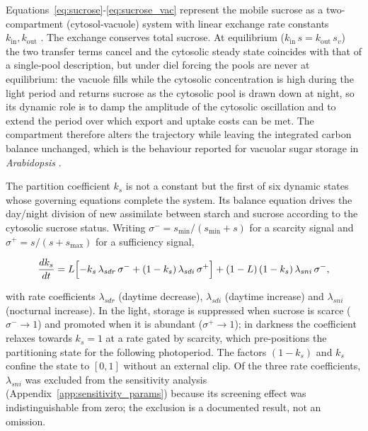 \documentclass[a4paper,fleqn]{cas-sc}
\begin{document}
Equations~\eqref{eq:sucrose}-\eqref{eq:sucrose_vac} represent the mobile
sucrose as a two-compartment (cytosol-vacuole) system with linear
exchange rate constants $k_{\text{in}},k_{\text{out}}$
\citep{Lohaus2000,Nadwodnik2008}. The exchange conserves total sucrose. At
equilibrium ($k_{\text{in}}\,s = k_{\text{out}}\,s_v$) the two transfer
terms cancel and the cytosolic steady state coincides with that of a
single-pool description, but under diel forcing the pools are never at
equilibrium: the vacuole fills while the cytosolic concentration is high
during the light period and returns sucrose as the cytosolic pool is drawn
down at night, so its dynamic role is to damp the amplitude of the
cytosolic oscillation and to extend the period over which export and
uptake costs can be met. The compartment therefore alters the trajectory
while leaving the integrated carbon balance unchanged, which is the
behaviour reported for vacuolar sugar storage in \textit{Arabidopsis}
\citep{Lohaus2000,Nadwodnik2008}.

The partition coefficient $k_s$ is not a constant but the first of six
dynamic states whose governing equations complete the system. Its balance
equation drives the day/night division of new assimilate between starch and
sucrose according to the cytosolic sucrose status. Writing
$\sigma^{-} = s_{\min}/(s_{\min}+s)$ for a scarcity signal and
$\sigma^{+} = s/(s+s_{\max})$ for a sufficiency signal,

\begin{equation}
\frac{dk_s}{dt} =
L\Bigl[
-k_s\,\lambda_{sdr}\,\sigma^{-}
+ (1-k_s)\,\lambda_{sdi}\,\sigma^{+}
\Bigr]
+ (1-L)\,(1-k_s)\,\lambda_{sni}\,\sigma^{-},
\label{eq:dks}
\end{equation}

with rate coefficients $\lambda_{sdr}$ (daytime decrease),
$\lambda_{sdi}$ (daytime increase) and $\lambda_{sni}$ (nocturnal
increase). In the light, storage is suppressed when sucrose is scarce
($\sigma^{-}\!\to\!1$) and promoted when it is abundant
($\sigma^{+}\!\to\!1$); in darkness the coefficient relaxes towards
$k_s = 1$ at a rate gated by scarcity, which pre-positions the partitioning
state for the following photoperiod. The factors $(1-k_s)$ and $k_s$
confine the state to $[0,1]$ without an external clip. Of the three rate
coefficients, $\lambda_{sni}$ was excluded from the sensitivity analysis
(Appendix~\ref{app:sensitivity_params}) because its screening effect was
indistinguishable from zero; the exclusion is a documented result, not an
omission.
\end{document}

